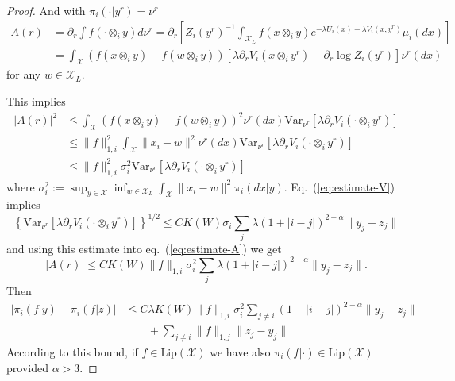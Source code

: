 \documentclass[a4paper,12pt,reqno]{amsart}
\newcommand{\X}{\mathcal{X}}
\begin{document}
\begin{proof}
And with $\pi_i(\cdot|y^r) = \nu^r$
\begin{equation}
  \begin{split}
A(r) & = \partial_r \int f(\cdot \otimes_i y) d\nu^r 
= \partial_r \left[Z_i(y^r)^{-1} \int_{\X_L}
  f(x \otimes_i y) e^{-\lambda U_i(x) -\lambda V_i(x,y^r)} \mu_i(dx)
  \right]
\\ &=  \int_{\X} (f(x\otimes_i y)-f(w \otimes_i y)) \left[ \lambda \partial_r
  V_i(x\otimes_i y^r) - \partial_r \log Z_i(y^r) \right] \nu^r(dx) 
  \end{split}
\end{equation}
for any $w \in \X_L$.

This implies
\begin{equation}
\label{eq:estimate-A}
  \begin{split}
|A(r)|^2 & \le  \int_{\X} (f(x\otimes_i y)-f(w \otimes_i y))^2  \nu^r(dx)
 \text{Var}_{\nu^r}\left[  \lambda \partial_r
  V_i(\cdot \otimes_i y^r )\right]
\\ & \le   \|f\|_{1,i}^2  \int_{\X} \|x_i-w\|^2  \nu^r(dx)
 \text{Var}_{\nu^r}\left[  \lambda \partial_r
  V_i(\cdot \otimes_i y^r )\right]   
\\ & \le   \|f\|_{1,i}^2  \sigma_i^2 
 \text{Var}_{\nu^r}\left[  \lambda \partial_r
  V_i(\cdot \otimes_i y^r )\right]   
  \end{split}
\end{equation}
where
$
\sigma_i^2 := \sup_{y\in\X} \inf_{w \in \X_L} \int_{\X} \|x_i-w\|^2  
\pi_i(dx|y).
$
Eq.~(\ref{eq:estimate-V}) implies
$$
\left\{\text{Var}_{\nu^r}\left[  \lambda \partial_r
  V_i(\cdot \otimes_i y^r )\right]\right\}^{1/2}   \le 
C K(W)  \sigma_i \sum_j
  \lambda (1+|i-j|)^{2-\alpha}  \|y_j-z_j\|
$$
and using this estimate into eq.~(\ref{eq:estimate-A}) we get
\begin{equation*}
  \left|A(r) \right| \le C K(W) \|f\|_{1,i}  \sigma_i^2 \sum_j
  \lambda (1+|i-j|)^{2-\alpha}  \|y_j-z_j\|.
\end{equation*}
Then
\begin{equation}
\label{eq:lip-bound}
  \begin{split}
 \left|\pi_i(f|y)-\pi_i(f|z)\right| & \le 
 C \lambda K(W) \|f\|_{1,i}  \sigma_i^2
  \sum_{j \neq i} (1+|i-j|)^{2-\alpha}  \|y_j-z_j\| 
\\ & \qquad + 
 \sum_{j\neq i} \|f\|_{1,j} \|z_j-y_j\| 
  \end{split}
\end{equation}
According to this bound, if $f \in \text{Lip}(\X)$ we have also $\pi_i(f|\cdot) \in
\text{Lip}(\X)$ provided $\alpha > 3$.


\end{proof}
\end{document}

